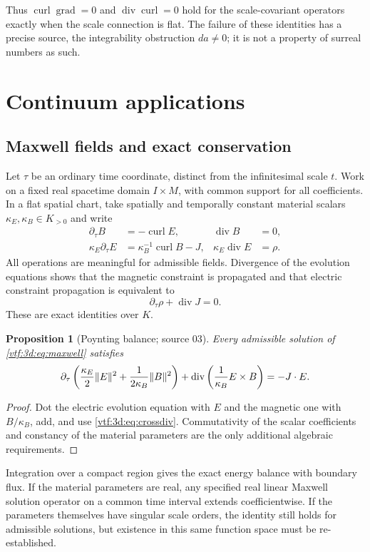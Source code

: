\documentclass[11pt,letterpaper]{article}
\newtheorem{proposition}[theorem]{Proposition}
\theoremstyle{definition}
\theoremstyle{remark}
\newcommand{\grad}{\operatorname{grad}}\newcommand{\Div}{\operatorname{div}}
\newcommand{\curl}{\operatorname{curl}}
\begin{document}
Thus $\curl\grad=0$ and $\Div\curl=0$ hold for the scale-covariant operators
exactly when the scale connection is flat. The failure of these identities has a
precise source, the integrability obstruction $da\ne0$; it is not a property of
surreal numbers as such.

\section{Continuum applications}\label{vtf:3d:sec:physics}

\subsection{Maxwell fields and exact conservation}
Let $\tau$ be an ordinary time coordinate, distinct from the infinitesimal scale $t$. Work on a fixed real spacetime domain $I\times M$, with common support for all coefficients. In a flat spatial chart, take spatially and temporally constant material scalars $\kappa_E,\kappa_B\in K_{>0}$ and write
\begin{align}
 \partial_\tau B&=-\curl E, &\Div B&=0,\\
 \kappa_E\partial_\tau E&=\kappa_B^{-1}\curl B-J,
 &\kappa_E\Div E&=\rho.\label{vtf:3d:eq:maxwell}
\end{align}
All operations are meaningful for admissible fields. Divergence of the evolution equations shows that the magnetic constraint is propagated and that electric constraint propagation is equivalent to
\[
 \partial_\tau\rho+\Div J=0.
\]
These are exact identities over $K$.

\begin{proposition}[Poynting balance; source 03]
Every admissible solution of \eqref{vtf:3d:eq:maxwell} satisfies
\[
 \partial_\tau\left(\frac{\kappa_E}2\norm E^2
                   +\frac1{2\kappa_B}\norm B^2\right)
 +\Div\left(\frac1{\kappa_B} E\times B\right)=-J\cdot E.
\]
\end{proposition}
\begin{proof}
Dot the electric evolution equation with $E$ and the magnetic one with $B/\kappa_B$, add, and use \eqref{vtf:3d:eq:crossdiv}. Commutativity of the scalar coefficients and constancy of the material parameters are the only additional algebraic requirements.
\end{proof}
Integration over a compact region gives the exact energy balance with boundary flux. If the material parameters are real, any specified real linear Maxwell solution operator on a common time interval extends coefficientwise. If the parameters themselves have singular scale orders, the identity still holds for admissible solutions, but existence in this same function space must be re-established.
\end{document}
